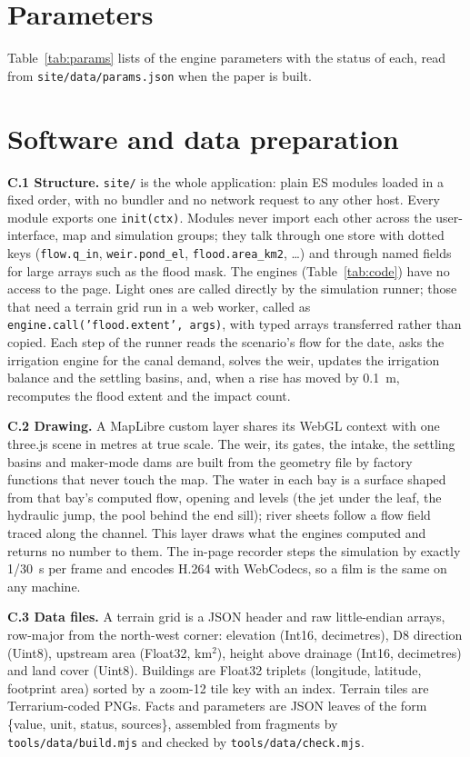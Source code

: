 \documentclass[10pt,a4paper,twocolumn]{extarticle}
\newcommand{\kmsq}{km$^2$}
\begin{document}
\section{Parameters}
\label{app:params}

Table~\ref{tab:params} lists \NParamsShown{} of the \NParams{} engine parameters with the status of each, read from
\texttt{site/data/params.json} when the paper is built.


\section{Software and data preparation}
\label{app:soft}

\textbf{C.1 Structure.} \texttt{site/} is the whole application: plain ES modules loaded in a fixed order, with no
bundler and no network request to any other host. Every module exports one \texttt{init(ctx)}. Modules never import
each other across the user-interface, map and simulation groups; they talk through one store with dotted keys
(\texttt{flow.q\_in}, \texttt{weir.pond\_el}, \texttt{flood.area\_km2}, \dots) and through named fields for large
arrays such as the flood mask. The engines (Table~\ref{tab:code}) have no access to the page. Light ones are called
directly by the simulation runner; those that need a terrain grid run in a web worker, called as
\texttt{engine.call('flood.extent', args)}, with typed arrays transferred rather than copied. Each step of the
runner reads the scenario's flow for the date, asks the irrigation engine for the canal demand, solves the weir,
updates the irrigation balance and the settling basins, and, when a rise has moved by 0.1~m, recomputes the flood
extent and the impact count.

\textbf{C.2 Drawing.} A MapLibre custom layer shares its WebGL context with one three.js scene in metres at true
scale. The weir, its gates, the intake, the settling basins and maker-mode dams are built from the geometry file by
factory functions that never touch the map. The water in each bay is a surface shaped from that bay's computed
flow, opening and levels (the jet under the leaf, the hydraulic jump, the pool behind the end sill); river sheets
follow a flow field traced along the channel. This layer draws what the engines computed and returns no number to
them. The in-page recorder steps the simulation by exactly 1/30~s per frame and encodes H.264 with WebCodecs, so a
film is the same on any machine.

\textbf{C.3 Data files.} A terrain grid is a JSON header and raw little-endian arrays, row-major from the
north-west corner: elevation (Int16, decimetres), D8 direction (Uint8), upstream area (Float32, \kmsq), height
above drainage (Int16, decimetres) and land cover (Uint8). Buildings are Float32 triplets (longitude, latitude,
footprint area) sorted by a zoom-12 tile key with an index. Terrain tiles are Terrarium-coded PNGs. Facts and
parameters are JSON leaves of the form \{value, unit, status, sources\}, assembled from fragments by
\texttt{tools/data/build.mjs} and checked by \texttt{tools/data/check.mjs}.
\end{document}
